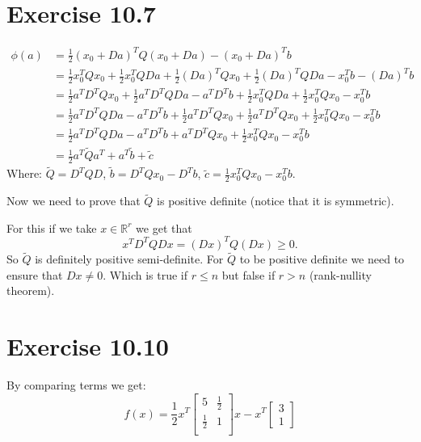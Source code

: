 \documentclass{article}
\begin{document}
\section*{Exercise 10.7}
\begin{align*}
	\phi(a)&=\frac{1}{2}(x_0+Da)^TQ(x_0+Da)-(x_0+Da)^Tb\\
	&=\frac{1}{2}x_0^TQx_0+\frac{1}{2}x_0^TQDa+\frac{1}{2}(Da)^TQx_0+\frac{1}{2}(Da)^TQDa -x_0^Tb-(Da)^Tb\\
	&=\frac{1}{2}a^TD^TQx_0+\frac{1}{2}a^TD^TQDa-a^TD^Tb+\frac{1}{2}x_0^TQDa + \frac{1}{2}x_0^TQx_0-x_0^Tb\\
	&=\frac{1}{2}a^TD^TQDa-a^TD^Tb+\frac{1}{2}a^TD^TQx_0+\frac{1}{2}a^TD^TQx_0 + \frac{1}{2}x_0^TQx_0-x_0^Tb\\
	&=\frac{1}{2}a^TD^TQDa-a^TD^Tb+a^TD^TQx_0+ \frac{1}{2}x_0^TQx_0-x_0^Tb\\
	&=\frac{1}{2}a^T\tilde{Q}a^T+a^T\tilde{b}+\tilde{c}
\end{align*}
Where: $\tilde{Q}=D^TQD$, $\tilde{b}=D^TQx_0-D^Tb$, $\tilde{c}=\frac{1}{2}x_0^TQx_0-x_0^Tb$.

Now we need to prove that $\tilde{Q}$ is positive definite (notice that it is symmetric).

For this if we take $x\in\mathbb{R}^r$ we get that
\[
	x^TD^TQDx=(Dx)^TQ(Dx)\geq 0.
\]
So $\tilde{Q}$ is definitely positive semi-definite. For $\tilde{Q}$ to be
positive definite we need to ensure that $Dx\neq 0$. Which is true if $r\leq n$
but false if $r>n$ (rank-nullity theorem).
\section*{Exercise 10.10}
By comparing terms we get:
\[
	f(x)=\frac{1}{2}x^T\begin{bmatrix}
	5 & \frac{1}{2} \\
	\frac{1}{2} & 1\\
	\end{bmatrix}x
	- x^T\begin{bmatrix}
	3\\
	1
	\end{bmatrix}
\]
\end{document}
